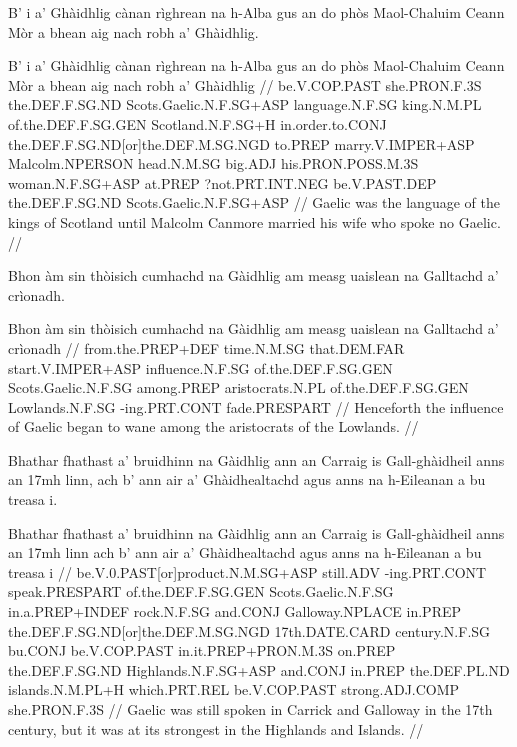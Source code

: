 \documentclass[a4paper,10pt]{article}
\begin{document}
\ex
\begingl
\glpre B' i a' Ghàidhlig cànan rìghrean na h-Alba gus an do phòs Maol-Chaluim Ceann Mòr a bhean aig nach robh a' Ghàidhlig. 

\vspace{4mm}
\gla B' i a' Ghàidhlig cànan rìghrean na h-Alba gus an do phòs Maol-Chaluim Ceann Mòr a bhean aig nach robh a' Ghàidhlig  //
\glb be.V.COP.PAST she.PRON.F.3S the.DEF.F.SG.ND Scots.Gaelic.N.F.SG+ASP language.N.F.SG king.N.M.PL of.the.DEF.F.SG.GEN Scotland.N.F.SG+H in.order.to.CONJ the.DEF.F.SG.ND[or]the.DEF.M.SG.NGD to.PREP marry.V.IMPER+ASP Malcolm.NPERSON head.N.M.SG big.ADJ his.PRON.POSS.M.3S woman.N.F.SG+ASP at.PREP ?not.PRT.INT.NEG be.V.PAST.DEP the.DEF.F.SG.ND Scots.Gaelic.N.F.SG+ASP  //
\glft Gaelic was the language of the kings of Scotland until Malcolm Canmore married his wife who spoke no Gaelic. //
\endgl
\xe

\ex
\begingl
\glpre Bhon àm sin thòisich cumhachd na Gàidhlig am measg uaislean na Galltachd a' crìonadh. 

\vspace{4mm}
\gla Bhon àm sin thòisich cumhachd na Gàidhlig {am measg} uaislean na Galltachd a' crìonadh  //
\glb from.the.PREP+DEF time.N.M.SG that.DEM.FAR start.V.IMPER+ASP influence.N.F.SG of.the.DEF.F.SG.GEN Scots.Gaelic.N.F.SG among.PREP aristocrats.N.PL of.the.DEF.F.SG.GEN Lowlands.N.F.SG -ing.PRT.CONT fade.PRESPART  //
\glft Henceforth the influence of Gaelic began to wane among the aristocrats of the Lowlands. //
\endgl
\xe

\ex
\begingl
\glpre Bhathar fhathast a' bruidhinn na Gàidhlig ann an Carraig is Gall-ghàidheil anns an 17mh linn, ach b' ann air a' Ghàidhealtachd agus anns na h-Eileanan a bu treasa i. 

\vspace{4mm}
\gla Bhathar fhathast a' bruidhinn na Gàidhlig {ann an} Carraig is Gall-ghàidheil anns an 17mh linn ach b' ann air a' Ghàidhealtachd agus anns na h-Eileanan a bu treasa i  //
\glb be.V.0.PAST[or]product.N.M.SG+ASP still.ADV -ing.PRT.CONT speak.PRESPART of.the.DEF.F.SG.GEN Scots.Gaelic.N.F.SG in.a.PREP+INDEF rock.N.F.SG and.CONJ Galloway.NPLACE in.PREP the.DEF.F.SG.ND[or]the.DEF.M.SG.NGD 17th.DATE.CARD century.N.F.SG bu.CONJ be.V.COP.PAST in.it.PREP+PRON.M.3S on.PREP the.DEF.F.SG.ND Highlands.N.F.SG+ASP and.CONJ in.PREP the.DEF.PL.ND islands.N.M.PL+H which.PRT.REL be.V.COP.PAST strong.ADJ.COMP she.PRON.F.3S  //
\glft Gaelic was still spoken in Carrick and Galloway in the 17th century, but it was at its strongest in the Highlands and Islands. //
\endgl
\xe
\end{document}
